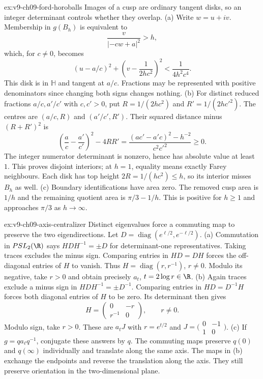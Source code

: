 \begin{solution}{ex:v9-ch09-ford-horoballs}
\idea Images of a cusp are ordinary tangent disks, so an integer determinant controls whether they overlap.
\writeup (a) Write $w=u+iv$. Membership in $g(B_h)$ is equivalent to
\[
\frac{v}{|-cw+a|^2}>h,
\]
which, for $c\ne0$, becomes
\[
(u-a/c)^2+\left(v-\frac1{2hc^2}\right)^2
<\frac1{4h^2c^4}.
\]
This disk is in $\mathbb H$ and tangent at $a/c$. Fractions may be represented with positive denominators since changing both signs changes nothing.
(b) For distinct reduced fractions $a/c,a'/c'$ with $c,c'>0$, put $R=1/(2hc^2)$ and $R'=1/(2hc'^2)$. The centres are $(a/c,R)$ and $(a'/c',R')$. Their squared distance minus $(R+R')^2$ is
\[
\left(\frac ac-\frac{a'}{c'}\right)^2-4RR'
=\frac{(ac'-a'c)^2-h^{-2}}{c^2c'^2}\ge0.
\]
The integer numerator determinant is nonzero, hence has absolute value at least $1$. This proves disjoint interiors; at $h=1$, equality means exactly Farey neighbours. Each disk has top height $2R=1/(hc^2)\le h$, so its interior misses $B_h$ as well.
(c) Boundary identifications have area zero. The removed cusp area is $1/h$ and the remaining quotient area is $\pi/3-1/h$. This is positive for $h\ge1$ and approaches $\pi/3$ as $h\to\infty$.
\end{solution}

\begin{solution}{ex:v9-ch09-axis-centralizer}
\idea Distinct eigenvalues force a commuting map to preserve the two eigendirections.
\writeup Let $D=\operatorname{diag}(e^{\ell/2},e^{-\ell/2})$.
(a) Commutation in $PSL_2(\R)$ says $HDH^{-1}=\pm D$ for determinant-one representatives. Taking traces excludes the minus sign. Comparing entries in $HD=DH$ forces the off-diagonal entries of $H$ to vanish. Thus $H=\operatorname{diag}(r,r^{-1})$, $r\ne0$. Modulo its negative, take $r>0$ and obtain precisely $a_t$, $t=2\log r\in\R$.
(b) Again traces exclude a minus sign in $HDH^{-1}=\pm D^{-1}$. Comparing entries in $HD=D^{-1}H$ forces both diagonal entries of $H$ to be zero. Its determinant then gives
\[
H=\begin{pmatrix}0&-r\\r^{-1}&0\end{pmatrix},\qquad r\ne0.
\]
Modulo sign, take $r>0$. These are $a_tJ$ with $r=e^{t/2}$ and $J=\bigl(\begin{smallmatrix}0&-1\\1&0\end{smallmatrix}\bigr)$.
(c) If $g=q a_\ell q^{-1}$, conjugate these answers by $q$. The commuting maps preserve $q(0)$ and $q(\infty)$ individually and translate along the same axis. The maps in (b) exchange the endpoints and reverse the translation along the axis. They still preserve orientation in the two-dimensional plane.
\end{solution}

